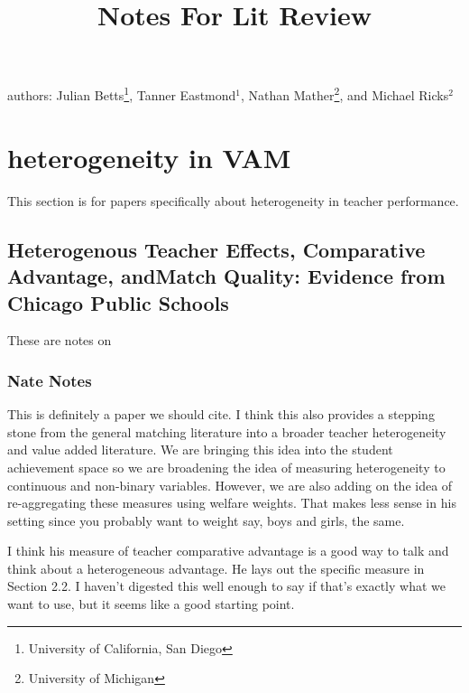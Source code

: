 \documentclass[letterpaper,12pt]{article}
\title{Notes For Lit Review}
\begin{document}

\maketitle
\noindent authors: Julian Betts\footnote{University of California, San Diego}, Tanner Eastmond$^1$, Nathan Mather\footnote{University of Michigan}, and Michael Ricks$^2$




\section{heterogeneity in VAM}

This section is for papers specifically about heterogeneity in teacher performance. 


    \subsection{Heterogenous Teacher Effects, Comparative Advantage, andMatch Quality: Evidence from Chicago Public Schools}
    
    These are notes on \cite{Delgado2020}

        \subsubsection{Nate Notes}
        This is definitely a paper we should cite. I think this also provides a stepping stone from the general matching literature into a broader teacher heterogeneity and value added literature. We are bringing this idea into the student achievement space so we are broadening the idea of measuring heterogeneity to continuous and non-binary variables. However, we are also adding on the idea of re-aggregating these measures using welfare weights. That makes less sense in his setting since you probably want to weight say, boys and girls, the same. 
        
        I think his measure of teacher comparative advantage is a good way to talk and think about a heterogeneous advantage. He lays out the specific measure in Section 2.2. I haven't digested this well enough to say if that's exactly what we want to use, but it seems like a good starting point. 
        
\end{document}

